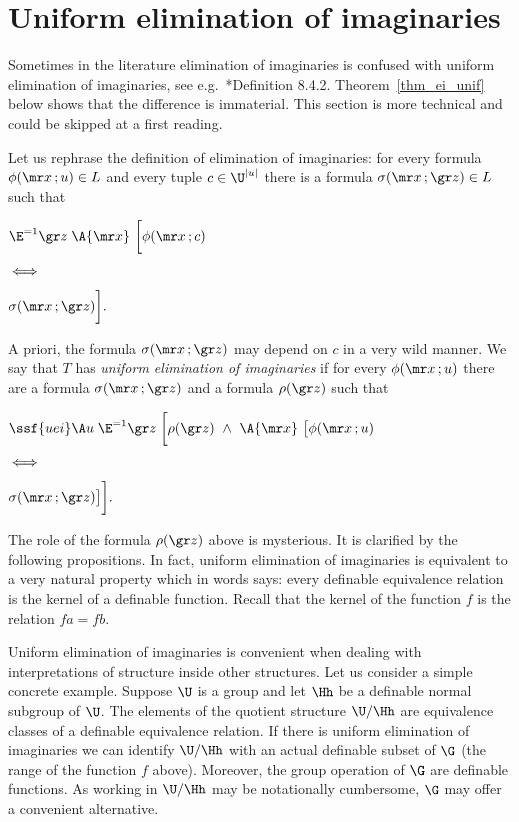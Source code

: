
\section{Uniform elimination of imaginaries}

\def\medrel#1{\parbox[t]{5ex}{$\displaystyle\hfil #1$}}
\def\ceq#1#2#3{\parbox[t]{35ex}{$\displaystyle #1$}\medrel{#2}{$\displaystyle #3$}}

Sometimes in the literature elimination of imaginaries is confused with uniform elimination of imaginaries, see e.g.~\cite{TZ}*{Definition 8.4.2}.
Theorem~\ref{thm_ei_unif} below shows that the difference is immaterial.
This section is more technical and could be skipped at a first reading.

Let us rephrase the definition of elimination of imaginaries: for every formula $\phi({\mr x}\,;u)\in L$ and every tuple $c\in\U^{|u|}$ there is a formula $\sigma({\mr x}\,;{\gr z})\in L$ such that

\ceq{\hfill\E^{=1} {\gr z}\;\A {\mr x}\ \bigg[\phi({\mr x}\,;c)}{\iff}{\sigma({\mr x}\,;{\gr z})\bigg].}

A priori, the formula $\sigma({\mr x}\,;{\gr z})$ may depend on $c$ in a very wild manner.
We say that $T$ has \emph{uniform elimination of imaginaries\/} if for every $\phi({\mr x}\,;u)$ there are a formula $\sigma({\mr x}\,;{\gr z})$ and a formula $\rho({\gr z})$ such that 

\ceq{\ssf{uei}\hfill\A u\;\E^{=1} {\gr z}\;\bigg[\rho({\gr z})\ \wedge\ \A{\mr x}\ \big[\phi({\mr x}\,;u)}{\iff}{\sigma({\mr x}\,;{\gr z})\big]\bigg].}

The role of the formula $\rho({\gr z})$ above is mysterious.
It is clarified by the following propositions.
In fact, uniform elimination of imaginaries is equivalent to a very natural property which in words says: every definable equivalence relation is the kernel of a definable function.
Recall that the kernel of the function $f$ is the relation $fa=fb$.

Uniform elimination of imaginaries is convenient when dealing with interpretations of structure inside other structures.
Let us consider a simple concrete example.
Suppose $\U$ is a group and let $\Hh$ be a definable normal subgroup of $\U$.
The elements of the quotient structure $\U/\Hh$ are equivalence classes of a definable equivalence relation.
If there is uniform elimination of imaginaries we can identify $\U/\Hh$ with an actual definable subset of $\G$ (the range of the function $f$ above).
Moreover, the group operation of $\G$ are definable functions.
As working in $\U/\Hh$ may be notationally cumbersome, $\G$ may offer a convenient alternative.

